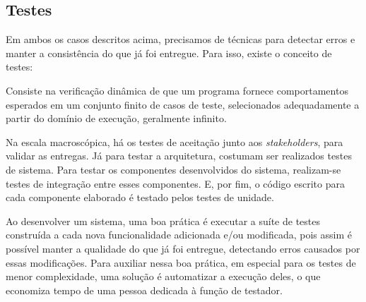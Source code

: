 \subsection{Testes}
Em ambos os casos descritos acima, precisamos de técnicas para detectar erros e manter a consistência do que já foi entregue. Para isso, existe o conceito de testes\cite[cap. ~4, p. ~1]{ieeecomputersociety2014}:

\begin{citacaoLonga}
Consiste na verificação dinâmica de que um programa fornece comportamentos esperados em um conjunto finito de casos de teste, selecionados adequadamente a partir do domínio de execução, geralmente infinito.
\end{citacaoLonga}

Na escala macroscópica, há os testes de aceitação junto aos \textit{stakeholders}, para validar as entregas. Já para testar a arquitetura, costumam ser realizados testes de sistema. Para testar os componentes desenvolvidos do sistema, realizam-se testes de integração entre esses componentes. E, por fim, o código escrito para cada componente elaborado é testado pelos testes de unidade.

Ao desenvolver um sistema, uma boa prática é executar a suíte de testes construída a cada nova funcionalidade adicionada e/ou modificada, pois assim é possível manter a qualidade do que já foi entregue, detectando erros causados por essas modificações. Para auxiliar nessa boa prática, em especial para os testes de menor complexidade, uma solução é automatizar a execução deles, o que economiza tempo de uma pessoa dedicada à função de testador.
